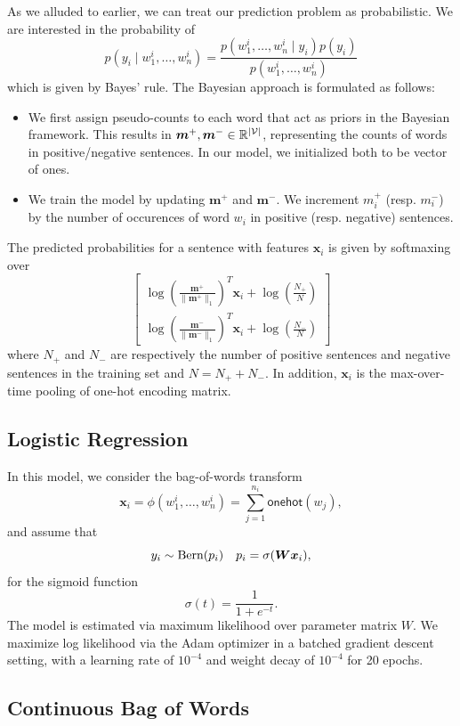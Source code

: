 \documentclass[11pt]{article}
\begin{document}
As we alluded to earlier, we can treat our prediction problem as probabilistic. We are interested in the probability of
\[
  p(y_i \mid w_1^i, \dots, w_n^i) = \frac{p(w_1^i, \dots, w_n^i \mid y_i) p(y_i)}{p(w_1^i, \dots, w_n^i)}
\]
which is given by Bayes' rule. The Bayesian approach is formulated as follows:
\newcommand{\bdm}{\bm{m}}
\begin{itemize}
  \item We first assign pseudo-counts to each word that act as priors in the Bayesian framework. This results in $\bdm^+, \bdm^- \in \mathbb{R}^{|\mcV|}$, representing the counts of words in positive/negative sentences. In our model, we initialized both to be vector of ones.
  \item We train the model by updating $\bdm^+$ and $\bdm^-$. We increment $m^+_i$ (resp. $m^-_i$) by the number of occurences of word $w_i$ in positive (resp. negative) sentences.
\end{itemize}
The predicted probabilities for a sentence with features $\bm x_i$ is given by softmaxing over
\[
  \begin{bmatrix}
    \log \left( \frac{\bdm^+}{\|\bdm^+\|_1} \right)^T \bm x_i + \log \left( \frac{N_+}{N} \right)\\
    \log \left( \frac{\bdm^-}{\|\bdm^-\|_1} \right)^T \bm x_i + \log \left( \frac{N_-}{N} \right)
  \end{bmatrix}
\]
where $N_+$ and $N_-$ are respectively the number of positive sentences and negative sentences in the training set and $N = N_+ + N_-$. In addition, $\bm x_i$ is the max-over-time pooling of one-hot encoding matrix.

\subsection{Logistic Regression}
\label{subsec:logistic}

In this model,  we consider the bag-of-words transform \[\bm x_i = \phi
(w_1^i,\ldots,w_n^i) =
\sum_{j=1}^{n_i} \mathsf{onehot}(w_j),\] and assume that \[
y_i \sim \operatorname{Bern}(p_i) \quad p_i = \sigma(\bm W\bm x_i),
\]
for the sigmoid function \[
\sigma(t) = \frac{1}{1+e^{-t}}. 
\]
The model is estimated via maximum likelihood over parameter matrix $W$. We
maximize log likelihood via the Adam optimizer in a batched gradient descent
setting, with a learning rate of $10^{-4}$
and weight decay of $10^{-4}$ for 20 epochs. 



\subsection{Continuous Bag of Words}
\label{subsec:cbow}
\end{document}
